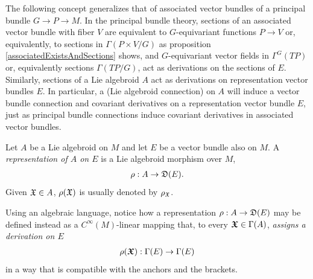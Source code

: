 





\linea

The following concept generalizes that of associated vector bundles of a principal bundle $G \to P \to M$. In the principal bundle theory, sections of an associated vector bundle with fiber $V$ are equivalent to $G$-equivariant functions $P \to V$ or, equivalently, to sections in $\Gamma(P \times V/G)$ as proposition \ref{associatedExistsAndSections} shows, and $G$-equivariant vector fields in $\Gamma^G(TP)$ or, equivalently sections $\Gamma(TP/G)$, act as derivations on the sections of $E$.%
Similarly, sections of a Lie algebroid $A$ act as derivations on representation vector bundles $E$. In particular, a (Lie algebroid connection) on $A$ will induce a vector bundle connection and covariant derivatives on a representation vector bundle $E$, just as principal bundle connections induce covariant derivatives in associated vector bundles.

\begin{definition}%
Let $A$ be a Lie algebroid on $M$ and let $E$ be a vector bundle also on $M$. A \emph{representation of $A$ on $E$} is a Lie algebroid morphism over $M$,
\begin{align}
    \rho: A \to \mathfrak{D}(E).
\end{align}
Given $\mathfrak{X} \in A$, $\rho(\mathfrak{X})$ is usually denoted by $\rho_{\mathfrak{X}}$.
\end{definition}
Using an algebraic language, notice how a representation $\rho:A \to \mathfrak{D}(E)$ may be defined instead as a $C^\infty(M)$-linear mapping that, to every $\bm{\mathfrak{X}} \in \Gamma(A)$, \emph{assigns a derivation on $E$} 
\begin{align}
    \rho(\bm{\mathfrak{X}}): \Gamma(E) \to \Gamma(E)
\end{align}
in a way that is compatible with the anchors and the brackets.

